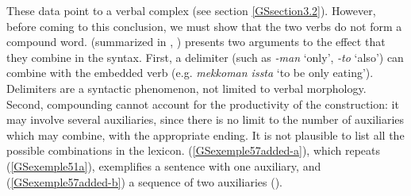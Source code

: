 \documentclass[output=paper
	        ,collection
	        ,collectionchapter
 	        ,biblatex
                ,babelshorthands
                ,newtxmath
                ,draftmode
                ,colorlinks, citecolor=brown
]{langscibook}
\begin{document}
{%
%

\eal
	\label{GSexemple56} 
	\label{GSexemple56a}

    \label{GSexemple56b}
\zl

These data point to a verbal complex (see section \ref{GSsection3.2}). However, before coming to this conclusion, we must show that the two verbs do not form a compound word. \cite{no1991case} (summarized in \citealt{Chung98a-u}, \citealt{Kim2016a-u}) presents two arguments to the effect that they combine in the syntax. First, a delimiter (such as \emph{-man} `only', \emph{-to} `also') can combine with the embedded verb (e.g. \emph{mekkoman issta} `to be only eating'). Delimiters are a syntactic phenomenon, not limited to verbal morphology. Second, compounding cannot account for the productivity of the construction: it may involve several auxiliaries, since there is no limit to the number of auxiliaries which may combine, with the appropriate ending. It is not plausible to list all the possible combinations in the lexicon. (\ref{GSexemple57added-a}), which repeats (\ref{GSexemple51a}), exemplifies a sentence with one auxiliary, and (\ref{GSexemple57added-b}) a sequence of two auxiliaries (\citealt[172]{Chung98a-u}).

}
\end{document}
